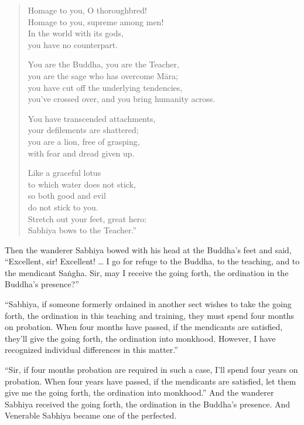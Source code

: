 \documentclass[12pt,openany]{book}%
\begin{document}
\begin{verse}
Homage to you, O thoroughbred! \\
Homage to you, supreme among men! \\
In the world with its gods, \\
you have no counterpart. 

You are the Buddha, you are the Teacher, \\
you are the sage who has overcome \textsanskrit{Māra}; \\
you have cut off the underlying tendencies, \\
you’ve crossed over, and you bring humanity across. 

You have transcended attachments, \\
your defilements are shattered; \\
you are a lion, free of grasping, \\
with fear and dread given up. 

Like a graceful lotus \\
to which water does not stick, \\
so both good and evil \\
do not stick to you. \\
Stretch out your feet, great hero: \\
Sabhiya bows to the Teacher.” 

%
\end{verse}

Then the wanderer Sabhiya bowed with his head at the Buddha’s feet and said, “Excellent, sir! Excellent! … I go for refuge to the Buddha, to the teaching, and to the mendicant \textsanskrit{Saṅgha}. Sir, may I receive the going forth, the ordination in the Buddha’s presence?” 

“Sabhiya, if someone formerly ordained in another sect wishes to take the going forth, the ordination in this teaching and training, they must spend four months on probation. When four months have passed, if the mendicants are satisfied, they’ll give the going forth, the ordination into monkhood. However, I have recognized individual differences in this matter.” 

“Sir, if four months probation are required in such a case, I’ll spend four years on probation. When four years have passed, if the mendicants are satisfied, let them give me the going forth, the ordination into monkhood.” And the wanderer Sabhiya received the going forth, the ordination in the Buddha’s presence. And Venerable Sabhiya became one of the perfected. 
\end{document}
